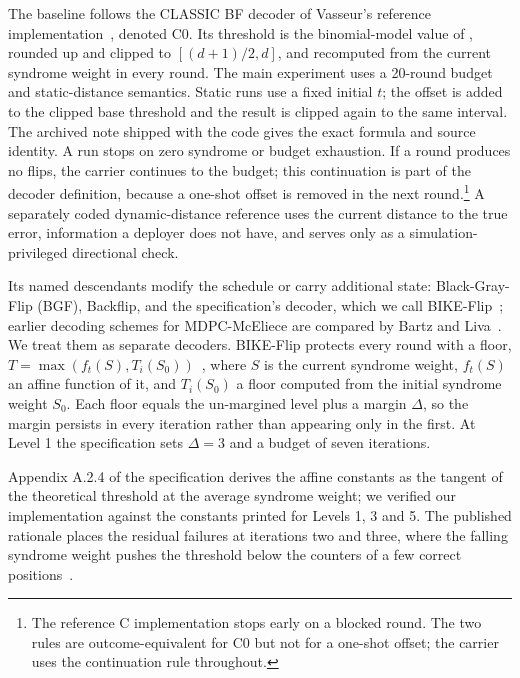 \documentclass[letterpaper,journal]{IEEEtran}
\begin{document}
The baseline follows the CLASSIC BF decoder of Vasseur's reference implementation~\cite{vasseur2021thesis}, denoted C0. Its threshold is the binomial-model value of , rounded up and clipped to $[(d+1)/2,d]$, and recomputed from the current syndrome weight in every round. The main experiment uses a 20-round budget and static-distance semantics. Static runs use a fixed initial $t$; the offset is added to the clipped base threshold and the result is clipped again to the same interval. The archived note  shipped with the code gives the exact formula and source identity. A run stops on zero syndrome or budget exhaustion. If a round produces no flips, the carrier continues to the budget; this continuation is part of the decoder definition, because a one-shot offset is removed in the next round.\footnote{The reference C implementation stops early on a blocked round. The two rules are outcome-equivalent for C0 but not for a one-shot offset; the carrier uses the continuation rule throughout.} A separately coded dynamic-distance reference uses the current distance to the true error, information a deployer does not have, and serves only as a simulation-privileged directional check.

Its named descendants modify the schedule or carry additional state: Black-Gray-Flip (BGF), Backflip, and the specification's decoder, which we call BIKE-Flip~\cite{drucker2020shades,vasseur2021thesis,bike2024spec}; earlier decoding schemes for MDPC-McEliece are compared by Bartz and Liva~\cite{bartz2019decoding}. We treat them as separate decoders. BIKE-Flip protects every round with a floor, $T=\max(f_t(S),T_i(S_0))$~\cite{bike2024spec}, where $S$ is the current syndrome weight, $f_t(S)$ an affine function of it, and $T_i(S_0)$ a floor computed from the initial syndrome weight $S_0$. Each floor equals the un-margined level plus a margin $\Delta$, so the margin persists in every iteration rather than appearing only in the first. At Level 1 the specification sets $\Delta=3$ and a budget of seven iterations.

Appendix A.2.4 of the specification derives the affine constants as the tangent of the theoretical threshold at the average syndrome weight; we verified our implementation against the constants printed for Levels 1, 3 and 5. The published rationale places the residual failures at iterations two and three, where the falling syndrome weight pushes the threshold below the counters of a few correct positions~\cite{sendrier2024seminar,wang2023weak}.
\end{document}
